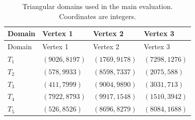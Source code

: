 \begin{longtable}{@{}lP{.27\linewidth}P{.27\linewidth}P{.27\linewidth}@{}}
\caption{Triangular domains used in the main evaluation. Coordinates are integers.}\label{tab:triangle_domains}\\
\toprule
Domain & Vertex 1 & Vertex 2 & Vertex 3 \\
\midrule\endfirsthead
\toprule
Domain & Vertex 1 & Vertex 2 & Vertex 3 \\
\midrule\endhead
\bottomrule\endfoot
$T_{1}$ & $(9026,8197)$ & $(1769,9178)$ & $(7298,1276)$ \\
$T_{2}$ & $(578,9933)$ & $(8598,7337)$ & $(2075,588)$ \\
$T_{3}$ & $(411,7999)$ & $(9004,9890)$ & $(3031,713)$ \\
$T_{4}$ & $(7922,8793)$ & $(9917,1548)$ & $(1510,3942)$ \\
$T_{5}$ & $(526,8526)$ & $(8696,8279)$ & $(8084,1688)$ \\
\end{longtable}
